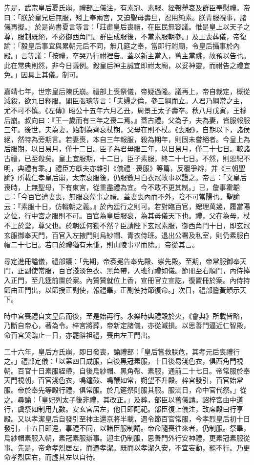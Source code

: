 先是，武宗皇后夏氏崩，禮部上儀注，有素冠、素服、絰帶舉哀及群臣奉慰禮。帝曰：「朕於皇兄后無服，矧上奉兩宮，又迫聖母壽旦，忍用純素。朕青服視事，諸儀再擬。」於是尚書夏言等言：「莊肅皇后喪禮，在臣民無容議。惟是皇上以天子之尊，服制既絕，不必御西角門。群臣成服後，不當素服朝參。」及上喪葬儀，帝復諭：「毅皇后事宜與累朝元后不同，無几筵之奉，當即行祔廟，令皇后攝事於內殿。」言等議：「按禮，卒哭乃行祔裡告。蓋以新主當入，舊主當祧，故預以告也。此在常典則然，非今日議例。毅皇后神主誠宜即祔太廟，以妥神靈，而祔告之禮宜免。」因具上其儀。制可。

嘉靖七年，世宗皇后陳氏崩。禮部上喪祭儀，帝疑過隆。議再上，帝自裁定，概從減殺，欲九日釋服。閣臣張璁等言：「夫婦之倫，參三綱而立。人君乃綱常之主，尤不可不慎。《左傳》昭公十五年六月乙丑，周景王太子壽卒。秋八月戊寅，王穆后崩。叔向曰：『王一歲而有三年之喪二焉。』蓋古禮，父為子，夫為妻，皆服報服三年。後世，夫為妻，始制為齊衰杖期，父母在則不杖。《喪服》，自期以下，諸侯絕，然特為旁期言。若妻喪，本自三年報服，殺為期年，則固未嘗絕者。今皇上為后服期，以日易月，僅十二日。臣子為君母服三年，以日易月，僅二十七日。較諸古禮，已至殺矣。皇上宜服期，十二日，臣子素服，終二十七日。不然，則恩紀不明，典禮有乖。」禮臣方獻夫亦雜引《儀禮·喪服》等篇，反覆爭辨，并《三朝聖諭》所載仁孝皇后崩，太宗衰服後，仍服數月白衣冠故事以證之。帝言：「文皇后喪時，上無聖母，下有東宮，從重盡禮為宜。今不敢不更其制。」已，詹事霍韜言：「今百官遭妻喪，無服衰蒞事之禮。蓋妻喪內而不外，陰不可當陽也。聖諭云：『素服十日，仿輟朝之義。』於內廷行之則可。若對臨百官，總理萬幾，履當陽之位，行中宮之服則不可。百官為皇后服衰，為其母儀天下也。禮，父在為母，杖不上於堂，尊父也。於朝廷何獨不然？臣請陛下玄冠素服，御西角門十日，即玄冠玄服御奉天門，百官入左掖門則烏紗帽、青衣侍班。退出公署及私室，則仍素服白帽二十七日。若曰於禮猶有未慊，則山陵事畢而除。」帝從其言。

尋定進冊謚儀，禮部議：「先期，帝袞冕告奉先殿、崇先殿。至期，帝常服御奉天門，正副使常服，百官淺淡色衣、黑角帶，入班行禮如儀。節冊至右順門，內侍捧入正門，至几筵前置於案。內贊贊就位上香，宣冊官立宣訖，復置冊於案。內侍持節由正門出，以節授正副使，報禮畢，正副使持節復命。」次日，禮部謄黃頒示天下。

時中宮喪禮自文皇后而後，至是始再行。永樂時典禮毀於火，《會典》所載皆略，乃斷自帝心，著為令。梓宮將葬，帝新定諸儀，亦從減損。以思善門逼近仁智殿，命百宮哭臨止一日，亦罷辭祖禮，喪由左王門出。

二十六年，皇后方氏崩，即日發喪，諭禮部：「皇后嘗救朕危，其考元后喪禮行之。」禮部定儀：「以第四日成服，自後黑冠素服，十日後易淺色衣，俱西角門視朝。百官十日素服絰帶，自後烏紗帽、黑角帶、素服，通前二十七日。帝常服於奉天門視朝，百官淺色衣，鳴鐘鼓、鳴鞭如常，朔望不升殿。梓宮發引，百官始常服。帝於奉先等殿行禮，俱常服。於几筵祭則服其服。服滿日，命中官代祭。」從之。尋諭：「皇妃列太子後非禮，其改正。」及葬，部臣以舊儀請。詔梓宮由中道行，虞祭如制用九數。安玄宮居左，他日即配祀。部臣復上儀注，改席殿曰行享殿。又以孝潔皇后自發引至神主還京將半載，遇令節百官常服，今孝烈皇后初十日發引，十五日即還，事禮不同，以諸臣服制請。帝命隨喪往來者，仍制服。祭畢，烏紗帽素服入朝，素冠素服辦事。迎主仍制服，思善門外行安神禮，更素冠素服從事。先是，帝命孝烈居左，而遷孝潔。既而以孝潔久安，不宜妄動，罷不行。乃更命孝烈居右，而虛其左以自待。

